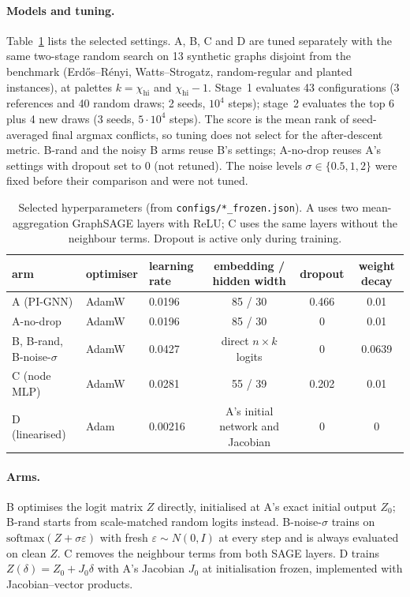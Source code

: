 \documentclass[11pt]{article}
\begin{document}
\paragraph{Models and tuning.} Table~\ref{tab:hparams} lists the selected settings. A, B, C and D are
tuned separately with the same two-stage random search on 13 synthetic graphs disjoint from the
benchmark (Erd\H{o}s--R\'enyi, Watts--Strogatz, random-regular and planted instances), at palettes
$k=\chi_{\mathrm{hi}}$ and $\chi_{\mathrm{hi}}-1$. Stage~1 evaluates 43 configurations (3 references
and 40 random draws; 2 seeds, $10^4$ steps); stage~2 evaluates the top 6 plus 4 new draws (3 seeds,
$5{\cdot}10^4$ steps). The score is the mean rank of seed-averaged final argmax conflicts, so tuning
does not select for the after-descent metric. B-rand and the noisy B arms reuse B's settings;
A-no-drop reuses A's settings with dropout set to 0 (not retuned). The noise levels
$\sigma\in\{0.5,1,2\}$ were fixed before their comparison and were not tuned.

\begin{table}[h]
\centering\small
\begin{tabular}{@{}lllccc@{}}
\toprule
arm & optimiser & learning rate & embedding / hidden width & dropout & weight decay \\
\midrule
A (PI-GNN) & AdamW & 0.0196 & 85 / 30 & 0.466 & 0.01 \\
A-no-drop & AdamW & 0.0196 & 85 / 30 & 0 & 0.01 \\
B, B-rand, B-noise-$\sigma$ & AdamW & 0.0427 & direct $n\times k$ logits & 0 & 0.0639 \\
C (node MLP) & AdamW & 0.0281 & 55 / 39 & 0.202 & 0.01 \\
D (linearised) & Adam & 0.00216 & A's initial network and Jacobian & 0 & 0 \\
\bottomrule
\end{tabular}
\caption{Selected hyperparameters (from \texttt{configs/*\_frozen.json}). A uses two mean-aggregation
GraphSAGE layers with ReLU; C uses the same layers without the neighbour terms. Dropout is active only
during training.}
\label{tab:hparams}
\end{table}

\paragraph{Arms.} B optimises the logit matrix $Z$ directly, initialised at A's exact initial output
$Z_0$; B-rand starts from scale-matched random logits instead. B-noise-$\sigma$ trains on
$\mathrm{softmax}(Z+\sigma\varepsilon)$ with fresh $\varepsilon\sim N(0,I)$ at every step and is always
evaluated on clean $Z$. C removes the neighbour terms from both SAGE layers. D trains
$Z(\delta)=Z_0+J_0\delta$ with A's Jacobian $J_0$ at initialisation frozen, implemented with
Jacobian--vector products.
\end{document}
